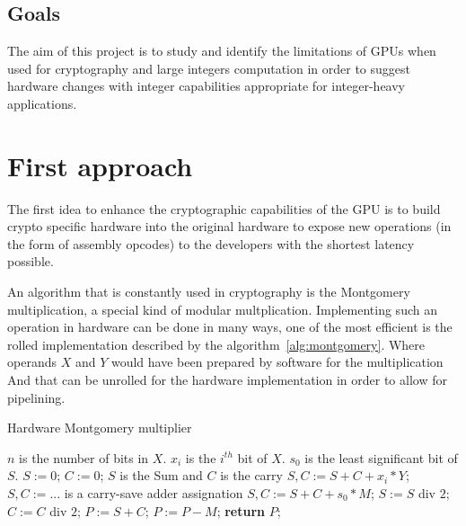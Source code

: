 \documentclass{report}
\begin{document}
\section{Goals}
    The aim of this project is to study and identify the limitations of GPUs
    when used for cryptography and large integers computation in order to suggest
    hardware changes with integer capabilities appropriate for integer-heavy applications.

\chapter{First approach}
    The first idea to enhance the cryptographic capabilities of the GPU is to
    build crypto specific hardware into the original hardware to expose new 
    operations (in the form of assembly opcodes) to the developers with the 
    shortest latency possible. 
    
    An algorithm that is constantly used in cryptography is the Montgomery multiplication,
    a special kind of modular multplication. Implementing such an operation in hardware can
    be done in many ways, one of the most efficient is the rolled implementation described
    by the algorithm~\ref{alg:montgomery}. Where operands $X$ and $Y$ would have been prepared
    by software for the multiplication And that can be unrolled for the hardware implementation
    in order to allow for pipelining.
    
    \begin{algorithm}
    \caption{Hardware Montgomery multiplier~\cite{montgomeryHard}}\label{alg:montgomery}
    \begin{algorithmic}[1]
        \Statex $n$ is the number of bits in $X$.
        \Statex $x_i$ is the $i^{th}$ bit of $X$.
        \Statex $s_0$ is the least significant bit of $S$. 		
        \State $S := 0$; $C := 0$; \Comment $S$ is the Sum and $C$ is the carry
            \State $S,C := S + C + x_i * Y$; \Comment $S,C := ...$ is a carry-save adder assignation
            \State $S,C := S + C + s_0 * M$;
            \State $S := S$ div $2$; $C := C$ div $2$;  
        \EndFor
        \State $P := S + C$;
            \State $P := P - M$;
        \EndIf
        \State \textbf{return} $P$;
    \end{algorithmic}
    \end{algorithm}
    
\end{document}
